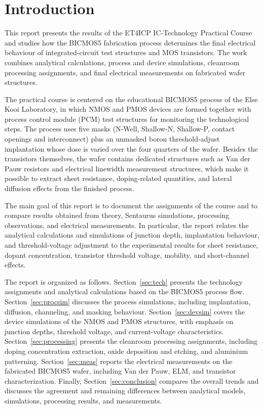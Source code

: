 \section{Introduction}

This report presents the results of the ET4ICP IC-Technology Practical Course and studies how the BICMOS5 fabrication process determines the final electrical behaviour of integrated-circuit test structures and MOS transistors. The work combines analytical calculations, process and device simulations, cleanroom processing assignments, and final electrical measurements on fabricated wafer structures.

The practical course is centered on the educational BICMOS5 process of the Else Kooi Laboratory, in which NMOS and PMOS devices are formed together with process control module (PCM) test structures for monitoring the technological steps. The process uses five masks (N-Well, Shallow-N, Shallow-P, contact openings and interconnect) plus an unmasked boron threshold-adjust implantation whose dose is varied over the four quarters of the wafer. Besides the transistors themselves, the wafer contains dedicated structures such as Van der Pauw resistors and electrical linewidth measurement structures, which make it possible to extract sheet resistance, doping-related quantities, and lateral diffusion effects from the finished process.

The main goal of this report is to document the assignments of the course and to compare results obtained from theory, Sentaurus simulations, processing observations, and electrical measurements. In particular, the report relates the analytical calculations and simulations of junction depth, implantation behaviour, and threshold-voltage adjustment to the experimental results for sheet resistance, dopant concentration, transistor threshold voltage, mobility, and short-channel effects.

The report is organized as follows. Section~\ref{sec:tech} presents the technology assignments and analytical calculations based on the BICMOS5 process flow. Section~\ref{sec:procsim} discusses the process simulations, including implantation, diffusion, channeling, and masking behaviour. Section~\ref{sec:devsim} covers the device simulations of the NMOS and PMOS structures, with emphasis on junction depths, threshold voltage, and current-voltage characteristics. Section~\ref{sec:processing} presents the cleanroom processing assignments, including doping concentration extraction, oxide deposition and etching, and aluminium patterning. Section~\ref{sec:meas} reports the electrical measurements on the fabricated BICMOS5 wafer, including Van der Pauw, ELM, and transistor characterization. Finally, Section~\ref{sec:conclusion} compares the overall trends and discusses the agreement and remaining differences between analytical models, simulations, processing results, and measurements.
